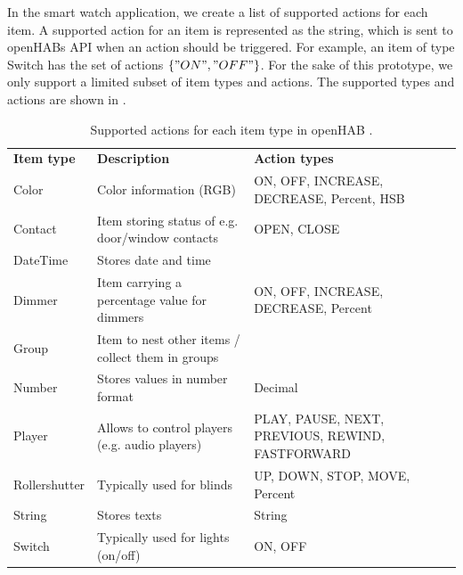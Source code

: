 In the smart watch application, we create a list of supported actions for each item. A supported action for an item is represented as the string, which is sent to openHABs API when an action should be triggered. For example, an item of type Switch has the set of actions $\{ "ON", "OFF" \}$. For the sake of this prototype, we only support a limited subset of item types and actions. The supported types and actions are shown in .

\begin{table}[]
\centering
\caption{Supported actions for each item type in openHAB \cite{eclipse:smarthomeitems}.}
\label{tbl:design:communication-with-openhab:types}
\begin{tabular}{p{2cm}p{6cm}p{6cm}}
\textbf{Item type} & \textbf{Description}                              & \textbf{Action types}                      \\ 
Color              & Color information (RGB)                           & ON, OFF, INCREASE, DECREASE, Percent, HSB      \\
Contact            & Item storing status of e.g. door/window contacts  & OPEN, CLOSE                                  \\
DateTime           & Stores date and time                              &                                            \\
Dimmer             & Item carrying a percentage value for dimmers      & ON, OFF, INCREASE, DECREASE, Percent           \\
Group              & Item to nest other items / collect them in groups &                                            \\
Number             & Stores values in number format                    & Decimal                                    \\
Player             & Allows to control players (e.g. audio players)    & PLAY, PAUSE, NEXT, PREVIOUS, REWIND, FASTFORWARD \\
Rollershutter      & Typically used for blinds                         & UP, DOWN, STOP, MOVE, Percent                  \\
String             & Stores texts                                      & String                                     \\
Switch             & Typically used for lights (on/off)                & ON, OFF                                     
\end{tabular}
\end{table}

